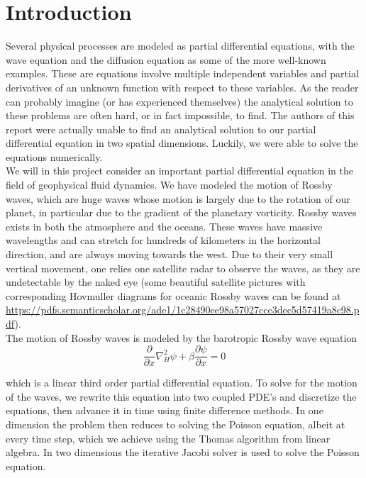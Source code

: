 \documentclass[12pt]{article}
\numberwithin{figure}{section}
\numberwithin{table}{section}
\begin{document}
\section{Introduction} \label{sec:intro}
Several physical processes are modeled as partial differential equations, with the wave equation and the diffusion equation as some of the more well-known examples. These are equations involve multiple independent variables and partial derivatives of an unknown function with respect to these variables. As the reader can probably imagine (or has experienced themselves) the analytical solution to these problems are often hard, or in fact impossible, to find. The authors of this report were actually unable to find an analytical solution to our partial differential equation in two spatial dimensions. Luckily, we were able to solve the equations numerically.\\

\noindent We will in this project consider an important partial differential equation in the field of geophysical fluid dynamics. We have modeled the motion of Rossby waves, which are huge waves whose motion is largely due to the rotation of our planet, in particular due to the gradient of the planetary vorticity. Rossby waves exists in both the atmosphere and the oceans. These waves have massive wavelengths and can stretch for hundreds of kilometers in the horizontal direction, and are always moving towards the west. Due to their very small vertical movement, one relies one satellite radar to observe the waves, as they are undetectable by the naked eye (some beautiful satellite pictures with corresponding Hovmuller diagrams for oceanic Rossby waves can be found at 
\url{https://pdfs.semanticscholar.org/ade1/1c28490ee98a57027ccc3dec5d57419a8c98.pdf}).\\

\noindent The motion of Rossby waves is modeled by the barotropic Rossby wave equation
\begin{equation}
\frac{\partial}{\partial x}\nabla_H^2\psi +\beta\frac{\partial \psi}{\partial x}=0
\end{equation}

\noindent which is a linear third order partial differential equation. To solve for the motion of the waves, we rewrite this equation into two coupled PDE's and discretize the equations, then advance it in time using finite difference methods. In one dimension the problem then reduces to solving the Poisson equation, albeit at every time step, which we achieve using the Thomas algorithm from linear algebra. In two dimensions the iterative Jacobi solver is used to solve the Poisson equation.\\
\end{document}

